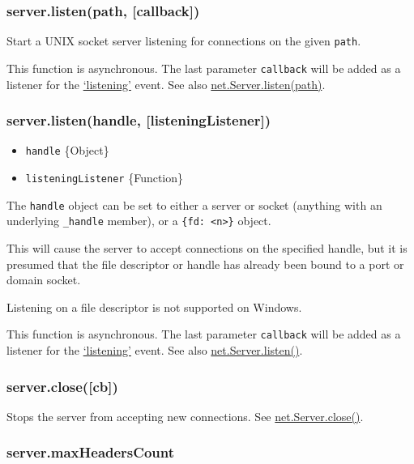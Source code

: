 \subsubsection{server.listen(path, {[}callback{]})}

Start a UNIX socket server listening for connections on the given
\texttt{path}.

This function is asynchronous. The last parameter \texttt{callback} will
be added as a listener for the
\href{net.html\#net\_event\_listening}{`listening'} event. See also
\href{net.html\#net\_server\_listen\_path\_listeninglistener}{net.Server.listen(path)}.

\subsubsection{server.listen(handle, {[}listeningListener{]})}

\begin{itemize}
\item
  \texttt{handle} \{Object\}
\item
  \texttt{listeningListener} \{Function\}
\end{itemize}

The \texttt{handle} object can be set to either a server or socket
(anything with an underlying \texttt{\_handle} member), or a
\texttt{\{fd: \textless{}n\textgreater{}\}} object.

This will cause the server to accept connections on the specified
handle, but it is presumed that the file descriptor or handle has
already been bound to a port or domain socket.

Listening on a file descriptor is not supported on Windows.

This function is asynchronous. The last parameter \texttt{callback} will
be added as a listener for the
\href{net.html\#event\_listening\_}{`listening'} event. See also
\href{net.html\#server.listen}{net.Server.listen()}.

\subsubsection{server.close({[}cb{]})}

Stops the server from accepting new connections. See
\href{net.html\#net\_server\_close\_cb}{net.Server.close()}.

\subsubsection{server.maxHeadersCount}

